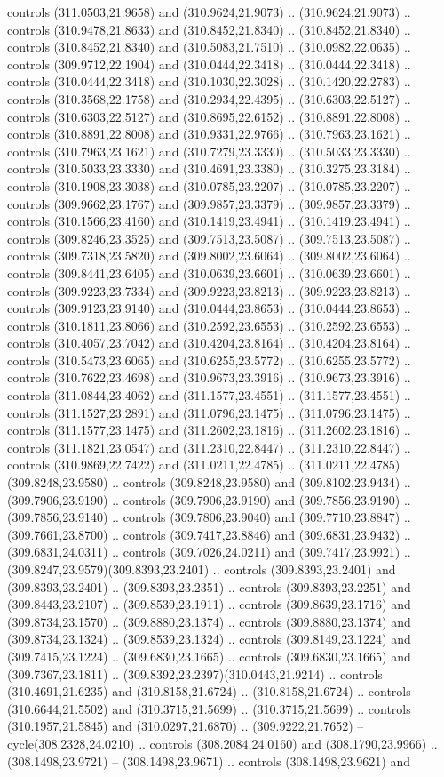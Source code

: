 controls (311.0503,21.9658) and (310.9624,21.9073) .. (310.9624,21.9073) .. controls (310.9478,21.8633) and (310.8452,21.8340) .. (310.8452,21.8340) .. controls (310.8452,21.8340) and (310.5083,21.7510) .. (310.0982,22.0635) .. controls (309.9712,22.1904) and (310.0444,22.3418) .. (310.0444,22.3418) .. controls (310.0444,22.3418) and (310.1030,22.3028) .. (310.1420,22.2783) .. controls (310.3568,22.1758) and (310.2934,22.4395) .. (310.6303,22.5127) .. controls (310.6303,22.5127) and (310.8695,22.6152) .. (310.8891,22.8008) .. controls (310.8891,22.8008) and (310.9331,22.9766) .. (310.7963,23.1621) .. controls (310.7963,23.1621) and (310.7279,23.3330) .. (310.5033,23.3330) .. controls (310.5033,23.3330) and (310.4691,23.3380) .. (310.3275,23.3184) .. controls (310.1908,23.3038) and (310.0785,23.2207) .. (310.0785,23.2207) .. controls (309.9662,23.1767) and (309.9857,23.3379) .. (309.9857,23.3379) .. controls (310.1566,23.4160) and (310.1419,23.4941) .. (310.1419,23.4941) .. controls (309.8246,23.3525) and (309.7513,23.5087) .. (309.7513,23.5087) .. controls (309.7318,23.5820) and (309.8002,23.6064) .. (309.8002,23.6064) .. controls (309.8441,23.6405) and (310.0639,23.6601) .. (310.0639,23.6601) .. controls (309.9223,23.7334) and (309.9223,23.8213) .. (309.9223,23.8213) .. controls (309.9123,23.9140) and (310.0444,23.8653) .. (310.0444,23.8653) .. controls (310.1811,23.8066) and (310.2592,23.6553) .. (310.2592,23.6553) .. controls (310.4057,23.7042) and (310.4204,23.8164) .. (310.4204,23.8164) .. controls (310.5473,23.6065) and (310.6255,23.5772) .. (310.6255,23.5772) .. controls (310.7622,23.4698) and (310.9673,23.3916) .. (310.9673,23.3916) .. controls (311.0844,23.4062) and (311.1577,23.4551) .. (311.1577,23.4551) .. controls (311.1527,23.2891) and (311.0796,23.1475) .. (311.0796,23.1475) .. controls (311.1577,23.1475) and (311.2602,23.1816) .. (311.2602,23.1816) .. controls (311.1821,23.0547) and (311.2310,22.8447) .. (311.2310,22.8447) .. controls (310.9869,22.7422) and (311.0211,22.4785) .. (311.0211,22.4785)(309.8248,23.9580) .. controls (309.8248,23.9580) and (309.8102,23.9434) .. (309.7906,23.9190) .. controls (309.7906,23.9190) and (309.7856,23.9190) .. (309.7856,23.9140) .. controls (309.7806,23.9040) and (309.7710,23.8847) .. (309.7661,23.8700) .. controls (309.7417,23.8846) and (309.6831,23.9432) .. (309.6831,24.0311) .. controls (309.7026,24.0211) and (309.7417,23.9921) .. (309.8247,23.9579)(309.8393,23.2401) .. controls (309.8393,23.2401) and (309.8393,23.2401) .. (309.8393,23.2351) .. controls (309.8393,23.2251) and (309.8443,23.2107) .. (309.8539,23.1911) .. controls (309.8639,23.1716) and (309.8734,23.1570) .. (309.8880,23.1374) .. controls (309.8880,23.1374) and (309.8734,23.1324) .. (309.8539,23.1324) .. controls (309.8149,23.1224) and (309.7415,23.1224) .. (309.6830,23.1665) .. controls (309.6830,23.1665) and (309.7367,23.1811) .. (309.8392,23.2397)(310.0443,21.9214) .. controls (310.4691,21.6235) and (310.8158,21.6724) .. (310.8158,21.6724) .. controls (310.6644,21.5502) and (310.3715,21.5699) .. (310.3715,21.5699) .. controls (310.1957,21.5845) and (310.0297,21.6870) .. (309.9222,21.7652) -- cycle(308.2328,24.0210) .. controls (308.2084,24.0160) and (308.1790,23.9966) .. (308.1498,23.9721) -- (308.1498,23.9671) .. controls (308.1498,23.9621) and 